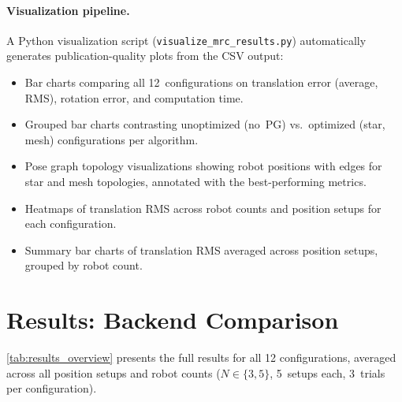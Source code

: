 \paragraph{Visualization pipeline.}
A Python visualization script (\texttt{visualize\_mrc\_results.py})
automatically generates publication-quality plots from the CSV output:
\begin{itemize}
    \item Bar charts comparing all 12~configurations on translation
          error (average, RMS), rotation error, and computation time.
    \item Grouped bar charts contrasting unoptimized (no~PG) vs.\
          optimized (star, mesh) configurations per algorithm.
    \item Pose graph topology visualizations showing robot positions
          with edges for star and mesh topologies, annotated with
          the best-performing metrics.
    \item Heatmaps of translation RMS across robot counts and
          position setups for each configuration.
    \item Summary bar charts of translation RMS averaged across
          position setups, grouped by robot count.
\end{itemize}

\section{Results: Backend Comparison}
\label{sec:backend_comparison}

\autoref{tab:results_overview} presents the full results for all 12
configurations, averaged across all position setups and robot counts
($N \in \{3, 5\}$, 5~setups each, 3~trials per configuration).

